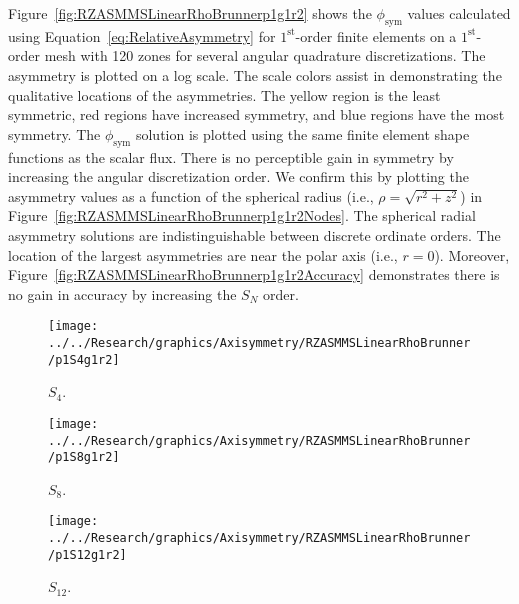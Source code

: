 \documentclass[12pt]{article}
\begin{document}
Figure~\ref{fig:RZASMMSLinearRhoBrunnerp1g1r2} shows the $\phi_\text{sym}$ values calculated using Equation~\ref{eq:RelativeAsymmetry} for $1^\text{st}$-order finite elements on a $1^\text{st}$-order mesh with 120 zones for several angular quadrature discretizations. The asymmetry is plotted on a log scale. The scale colors assist in demonstrating the qualitative locations of the asymmetries. The yellow region is the least symmetric, red regions have increased symmetry, and blue regions have the most symmetry. The $\phi_\text{sym}$ solution is plotted using the same finite element shape functions as the scalar flux. There is no perceptible gain in symmetry by increasing the angular discretization order. We confirm this by plotting the asymmetry values as a function of the spherical radius (i.e., $\rho=\sqrt{r^2+z^2}$) in Figure~\ref{fig:RZASMMSLinearRhoBrunnerp1g1r2Nodes}. The spherical radial asymmetry solutions are indistinguishable between discrete ordinate orders. The location of the largest asymmetries are near the polar axis (i.e., $r=0$). Moreover, Figure~\ref{fig:RZASMMSLinearRhoBrunnerp1g1r2Accuracy} demonstrates there is no gain in accuracy by increasing the $S_N$ order.

\begin{sidewaysfigure}[!htb]
\centering
\begin{subfigure}{0.33\textwidth}
\texttt{[image: ../../Research/graphics/Axisymmetry/RZASMMSLinearRhoBrunner/p1S4g1r2]}
\caption{$S_4$.}
\end{subfigure}%
\begin{subfigure}{0.33\textwidth}
\texttt{[image: ../../Research/graphics/Axisymmetry/RZASMMSLinearRhoBrunner/p1S8g1r2]}
\caption{$S_8$.}
\end{subfigure}%
\begin{subfigure}{0.33\textwidth}
\texttt{[image: ../../Research/graphics/Axisymmetry/RZASMMSLinearRhoBrunner/p1S12g1r2]}
\caption{$S_{12}$.}
\end{subfigure}
\caption{Relative asymmetry for $1^\text{st}$-order finite elements on a $1^\text{st}$-order mesh for given order of level-symmetric angular quadrature.}
\label{fig:RZASMMSLinearRhoBrunnerp1g1r2}
\end{sidewaysfigure}
\end{document}
